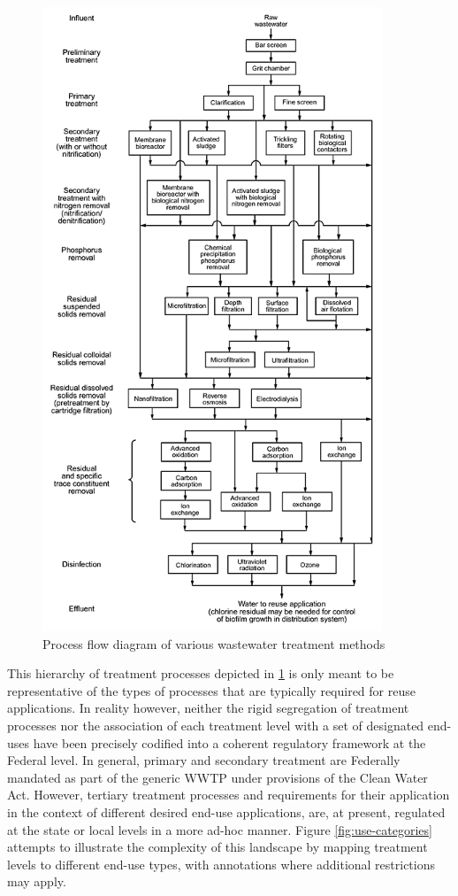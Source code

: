      \begin{figure}[!h]
       \centering
       \includegraphics[width=4in]{figures/process-flow.png}
       \caption[Process Flow Diagram of Wastewater Treatment Methods]{Process flow diagram of various wastewater treatment methods}
       \label{fig:process-flow-diagram}
     \end{figure}

This hierarchy of treatment processes depicted in \ref{fig:process-flow-diagram} is only meant to be representative of the types of processes that are typically required for reuse applications. In reality however, neither the rigid segregation of treatment processes nor the association of each treatment level with a set of designated end-uses have been precisely codified into a coherent regulatory framework at the Federal level. In general, primary and secondary treatment are Federally mandated as part of the generic WWTP under provisions of the Clean Water Act. However, tertiary treatment processes and requirements for their application in the context of different desired end-use applications, are, at present, regulated at the state or local levels in a more ad-hoc manner. Figure \ref{fig:use-categories} attempts to illustrate the complexity of this landscape by mapping treatment levels to different end-use types, with annotations where additional restrictions may apply.

